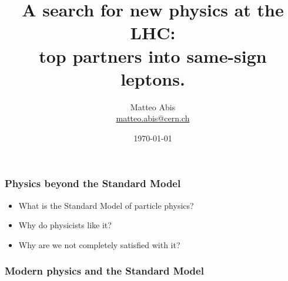 \documentclass[ukenglish]{beamer}
\title[Top Partners at the LHC]{A search for new physics at the LHC:\\
top partners into same-sign leptons.}
\author{Matteo Abis\\
\url{matteo.abis@cern.ch}}
\institute{Università di Padova and CERN}
\date{\today}
\begin{document}
\begin{frame}
  \titlepage
\end{frame}
 
\begin{frame}
    \frametitle{Physics beyond the Standard Model}
    \begin{itemize}
        \item What is the Standard Model of particle physics?
        \item Why do physicists like it?
        \item Why are we not completely satisfied with it?
    \end{itemize}
\end{frame}

\begin{frame}
    \frametitle{Modern physics and the Standard Model}
\end{frame}
\end{document}

